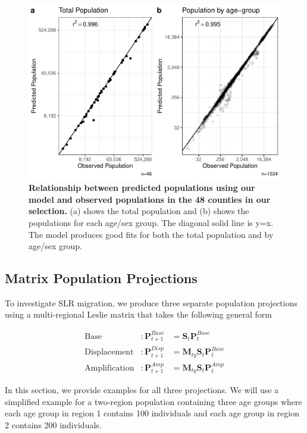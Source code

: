\documentclass[12pt]{article}
\begin{document}
\begin{figure}
\includegraphics[width=1\linewidth]{evalfig-1} \caption{\textbf{Relationship between predicted populations using our model and observed populations in the 48 counties in our selection.} (a) shows the total population and (b) shows the populations for each age/sex group. The diagonal solid line is y=x. The model produces good fits for both the total population and by age/sex group. \label{EvalFig}}\label{fig:figeval}
\end{figure}

\hypertarget{matrix-population-projections}{%
\subsection{Matrix Population
Projections}\label{matrix-population-projections}}

To investigate SLR migration, we produce three separate population
projections using a multi-regional Leslie matrix that takes the
following general form

\begin{equation}
 \begin{array}{lll}
\text{Base}          &: \mathbf{P}_{t+1}^{Base} & =\mathbf{S}_t\mathbf{P}_t^{Base}\\
\text{Displacement}  &: \mathbf{P}_{t+1}^{Disp} &= \mathbf{M}_{ty}\mathbf{S}_{t}\mathbf{P}_t^{Base} \\
\text{Amplification} &: \mathbf{P}_{t+1}^{Amp}  &=\mathbf{M}_{ty}\mathbf{S}_{t}\mathbf{P}_t^{Amp}
\end{array}
\end{equation}

In this section, we provide examples for all three projections. We will
use a simplified example for a two-region population containing three
age groups where each age group in region 1 contains 100 individuals and
each age group in region 2 contains 200 individuals.
\end{document}
